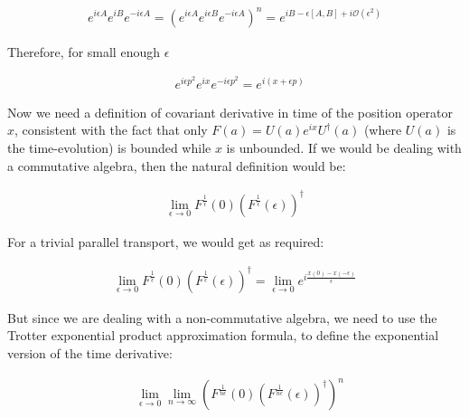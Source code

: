 \documentclass[11pt]{book}
\begin{document}
\begin{equation}\begin{aligned}
    e^{i\epsilon A}e^{iB}e^{-i\epsilon A}=(e^{i\epsilon A}e^{i\epsilon
        B}e^{-i\epsilon
        A})^n=e^{iB-\epsilon[A,B]+i\mathcal{O}(\epsilon^2)}\end{aligned}\end{equation}

Therefore, for small enough \(\epsilon\)

\begin{equation}\begin{aligned}
    &e^{i\epsilon p^2}e^{i x}e^{-i\epsilon p^2}
    =e^{i (x+\epsilon p)}\end{aligned}\end{equation}

Now we need a definition of covariant derivative in time of the position
operator \(x\), consistent with the fact that only
\(F(a)=U(a)e^{i x}U^\dagger (a)\) (where \(U(a)\) is the time-evolution)
is bounded while \(x\) is unbounded. If we would be dealing with a
commutative algebra, then the natural definition would be:

\begin{equation}\begin{aligned}
    \lim_{\epsilon \to 0} F^{\frac{1}{\epsilon}}(0)(F^{\frac{1}{\epsilon}}(\epsilon))^{\dagger}\end{aligned}\end{equation}

For a trivial parallel transport, we would get as required:

\begin{equation}\begin{aligned}
    \lim_{\epsilon \to 0} F^{\frac{1}{\epsilon}}(0)(F^{\frac{1}{\epsilon}}(\epsilon))^{\dagger}=\lim_{\epsilon \to 0}e^{i \frac{x(0)-x(-\epsilon)}{\epsilon}}\end{aligned}\end{equation}

But since we are dealing with a non-commutative algebra, we need to use
the Trotter exponential product approximation formula, to define the
exponential version of the time derivative:

\begin{equation}\begin{aligned}
    &\lim_{\epsilon \to 0}\lim_{n \to \infty}(F^{\frac{1}{n\epsilon}}(0)(F^{\frac{1}{n\epsilon}}(\epsilon))^{\dagger})^n\end{aligned}\end{equation}
\end{document}

